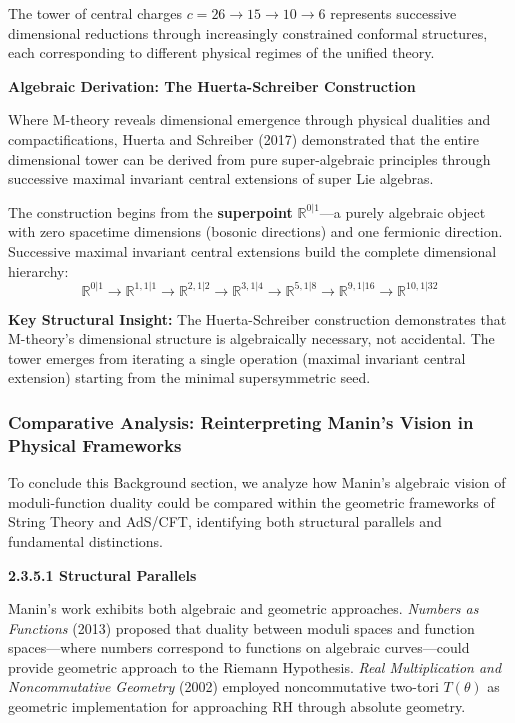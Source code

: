 The tower of central charges $c = 26 \to 15 \to 10 \to 6$ represents successive dimensional reductions through increasingly constrained conformal structures, each corresponding to different physical regimes of the unified theory.

\textbf{Algebraic Derivation: The Huerta-Schreiber Construction}

Where M-theory reveals dimensional emergence through physical dualities and compactifications, Huerta and Schreiber (2017) \cite{HuertaSchreiber2017} demonstrated that the entire dimensional tower can be derived from pure super-algebraic principles through successive maximal invariant central extensions of super Lie algebras.

The construction begins from the \textbf{superpoint} $\mathbb{R}^{0|1}$—a purely algebraic object with zero spacetime dimensions (bosonic directions) and one fermionic direction. Successive maximal invariant central extensions build the complete dimensional hierarchy:
\[
    \mathbb{R}^{0|1} \to \mathbb{R}^{1,1|1} \to \mathbb{R}^{2,1|2} \to \mathbb{R}^{3,1|4} \to \mathbb{R}^{5,1|8} \to \mathbb{R}^{9,1|16} \to \mathbb{R}^{10,1|32}
\]

\textbf{Key Structural Insight:} The Huerta-Schreiber construction demonstrates that M-theory's dimensional structure is algebraically necessary, not accidental. The tower emerges from iterating a single operation (maximal invariant central extension) starting from the minimal supersymmetric seed.

\subsubsection{Comparative Analysis: Reinterpreting Manin's Vision in Physical Frameworks}

To conclude this Background section, we analyze how Manin's algebraic vision of moduli-function duality could be compared within the geometric frameworks of String Theory and AdS/CFT, identifying both structural parallels and fundamental distinctions.

\textbf{2.3.5.1 Structural Parallels}

Manin's work exhibits both algebraic and geometric approaches. \textit{Numbers as Functions} (2013) proposed that duality between moduli spaces and function spaces—where numbers correspond to functions on algebraic curves—could provide geometric approach to the Riemann Hypothesis. \textit{Real Multiplication and Noncommutative Geometry} (2002) employed noncommutative two-tori $T(\theta)$ as geometric implementation for approaching RH through absolute geometry.

